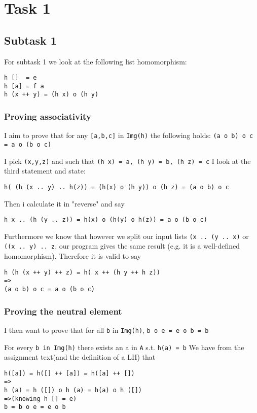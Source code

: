 \documentclass[11pt]{article}
\author{Christian P.}
\date{\today}
\title{}
\begin{document}
\tableofcontents

\section{Task 1}
\label{sec:org51cb4a9}
\subsection{Subtask 1}
\label{sec:org1244989}
For subtask 1 we look at the following list homomorphism:
\begin{verbatim}
h []  = e
h [a] = f a
h (x ++ y) = (h x) o (h y)
\end{verbatim}
\subsubsection{Proving associativity}
\label{sec:org3a00b45}
I aim to prove that for any \texttt{[a,b,c]} in \texttt{Img(h)} the following holds: \texttt{(a o b) o c = a o (b o c)} 

I pick \texttt{(x,y,z)} and such that \texttt{(h x) = a, (h y) = b, (h z) = c} 
I look at the third statement and state:
\begin{verbatim}
h( (h (x .. y) .. h(z)) = (h(x) o (h y)) o (h z) = (a o b) o c
\end{verbatim}
Then i calculate it in "reverse" and say
\begin{verbatim}
h x .. (h (y .. z)) = h(x) o (h(y) o h(z)) = a o (b o c)
\end{verbatim}
Furthermore we know that however we split our input lists \texttt{(x .. (y .. x)} or \texttt{((x .. y) .. z}, our
program gives the same result (e.g. it is a well-defined homomorphism). Therefore it is valid to say
\begin{verbatim}
h (h (x ++ y) ++ z) = h( x ++ (h y ++ h z))
=>
(a o b) o c = a o (b o c)
\end{verbatim}

\subsubsection{Proving the neutral element}
\label{sec:org2f5e120}
I then want to prove that for all \texttt{b} in \texttt{Img(h)}, \texttt{b o e = e o b = b}  

For every \texttt{b in Img(h)} there exists an a in \texttt{A} s.t. \texttt{h(a) = b}
We have from the assignment text(and the definition of a LH) that
\begin{verbatim}
h([a]) = h([] ++ [a]) = h([a] ++ [])
=> 
h (a) = h ([]) o h (a) = h(a) o h ([])
=>(knowing h [] = e)
b = b o e = e o b
\end{verbatim}
\end{document}
